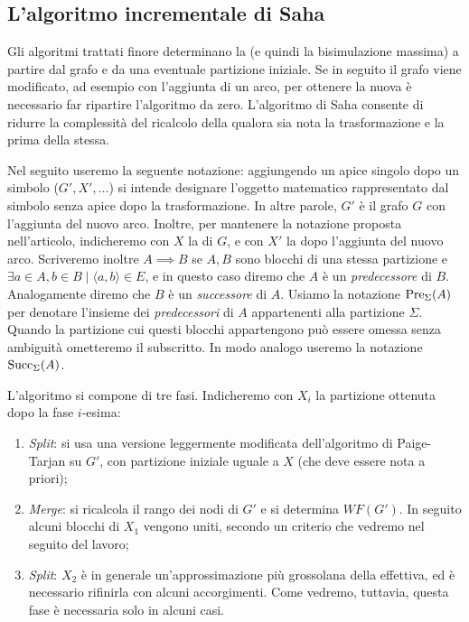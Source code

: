 \subsection{L'algoritmo incrementale di Saha}
Gli algoritmi trattati finore determinano la \rscpnomath (e quindi la bisimulazione massima) a partire dal grafo e da una eventuale partizione iniziale. Se in seguito il grafo viene modificato, ad esempio con l'aggiunta di un arco, per ottenere la nuova \rscpnomath è necessario far ripartire l'algoritmo da zero. L'algoritmo di Saha \cite{saha} consente di ridurre la complessità del ricalcolo della \rscpnomath qualora sia nota la trasformazione e la \rscpnomath prima della stessa.

Nel seguito useremo la seguente notazione: aggiungendo un apice singolo dopo un simbolo ($G', X', \dots$) si intende designare l'oggetto matematico rappresentato dal simbolo senza apice dopo la trasformazione. In altre parole, $G'$ è il grafo $G$ con l'aggiunta del nuovo arco. Inoltre, per mantenere la notazione proposta nell'articolo, indicheremo con $X$ la \rscpnomath di $G$, e con $X'$ la \rscpnomath dopo l'aggiunta del nuovo arco. Scriveremo inoltre $A \implies B$ se $A,B$ sono blocchi di una stessa partizione e $\exists a \in A, b \in B \mid \langle a, b\rangle \in E$, e in questo caso diremo che $A$ è un \emph{predecessore} di $B$. Analogamente diremo che $B$ è un \emph{successore} di $A$. Usiamo la notazione $\textup{Pre}_{\Sigma}(A)$ per denotare l'insieme dei \emph{predecessori} di $A$ appartenenti alla partizione $\Sigma$. Quando la partizione cui questi blocchi appartengono può essere omessa senza ambiguità ometteremo il subscritto. In modo analogo useremo la notazione $\textup{Succ}_{\Sigma}(A)$.

L'algoritmo si compone di tre fasi. Indicheremo con $X_i$ la partizione ottenuta dopo la fase $i$-esima:
\begin{enumerate}
    \item \emph{Split}: si usa una versione leggermente modificata dell'algoritmo di Paige-Tarjan su $G'$, con partizione iniziale uguale a $X$ (che deve essere nota a priori);
    \item \emph{Merge}: si ricalcola il rango dei nodi di $G'$ e si determina $WF(G')$. In seguito alcuni blocchi di $X_1$ vengono uniti, secondo un criterio che vedremo nel seguito del lavoro;
    \item \emph{Split}: $X_2$ è in generale un'approssimazione più grossolana della \rscpnomath effettiva, ed è necessario rifinirla con alcuni accorgimenti. Come vedremo, tuttavia, questa fase è necessaria solo in alcuni casi.
\end{enumerate}

